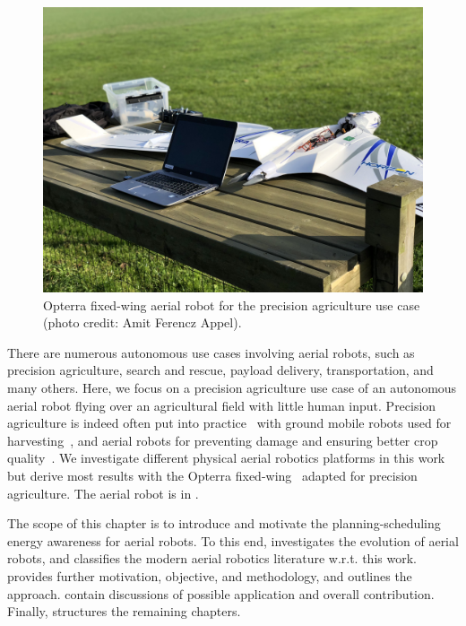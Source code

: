 \begin{figure}[t!]
  \centering
  \includegraphics[width=.7\textwidth]{pictures/photo}
  \caption[Opterra fixed-wing aerial robot for the precision agriculture use case]{Opterra fixed-wing aerial robot for the precision agriculture use case {\scriptsize(photo credit: Amit Ferencz Appel)}.}
  \label{fig:opterra}
\end{figure}
There are numerous autonomous use cases involving aerial robots, such as precision agriculture, search and rescue, payload delivery, transportation, and many others. Here, we focus on a precision agriculture use case of an autonomous aerial robot flying over an agricultural field with little human input. Precision agriculture is indeed often put into practice~\citep{hajjaj2014review} with ground mobile robots used for harvesting~\citep{qingchun2012study,dong2011development, de2011design, aljanobi2010setup, li2008analysis, edan2000robotic}, and aerial robots for preventing damage and ensuring better crop quality~\citep{puri2017agriculture, daponte2019review}. We investigate different physical aerial robotics platforms in this work but derive most results with the Opterra fixed-wing~\citep{opterra} adapted for precision agriculture. The aerial robot is in .

The scope of this chapter is to introduce and motivate the planning-scheduling energy awareness for aerial robots. To this end,  investigates the evolution of aerial robots, and  classifies the modern aerial robotics literature w.r.t. this work.  provides further motivation, objective, and methodology, and  outlines the approach.  contain discussions of possible application and overall contribution. Finally,  structures the remaining chapters.

